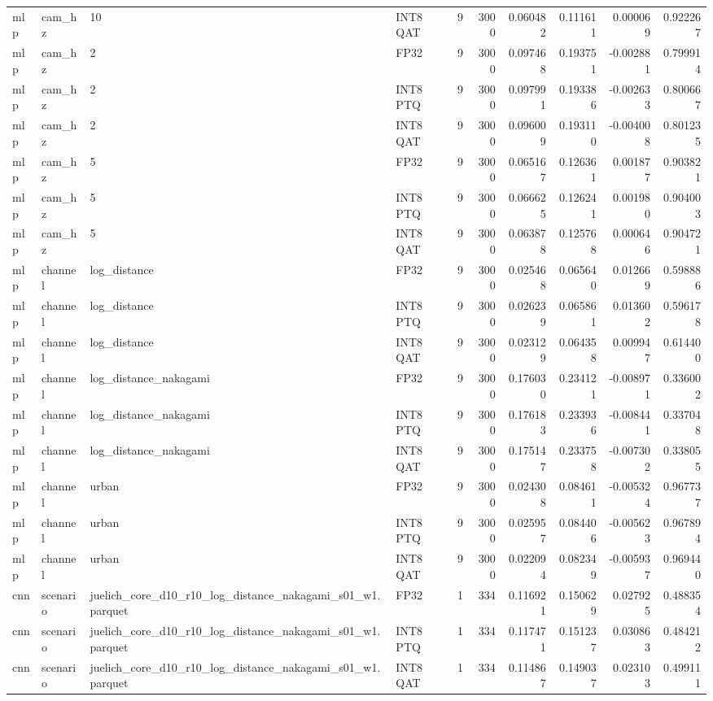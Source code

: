 \begin{tabular}{llllrrrrrr}
mlp & cam\_hz & 10 & INT8 QAT & 9 & 3000 & 0.060482 & 0.111611 & 0.000069 & 0.922267 \\
mlp & cam\_hz & 2 & FP32 & 9 & 3000 & 0.097468 & 0.193751 & -0.002881 & 0.799914 \\
mlp & cam\_hz & 2 & INT8 PTQ & 9 & 3000 & 0.097991 & 0.193386 & -0.002633 & 0.800667 \\
mlp & cam\_hz & 2 & INT8 QAT & 9 & 3000 & 0.096009 & 0.193110 & -0.004008 & 0.801235 \\
mlp & cam\_hz & 5 & FP32 & 9 & 3000 & 0.065167 & 0.126361 & 0.001877 & 0.903821 \\
mlp & cam\_hz & 5 & INT8 PTQ & 9 & 3000 & 0.066625 & 0.126241 & 0.001980 & 0.904003 \\
mlp & cam\_hz & 5 & INT8 QAT & 9 & 3000 & 0.063878 & 0.125768 & 0.000646 & 0.904721 \\
mlp & channel & log\_distance & FP32 & 9 & 3000 & 0.025468 & 0.065640 & 0.012669 & 0.598886 \\
mlp & channel & log\_distance & INT8 PTQ & 9 & 3000 & 0.026239 & 0.065861 & 0.013602 & 0.596178 \\
mlp & channel & log\_distance & INT8 QAT & 9 & 3000 & 0.023129 & 0.064358 & 0.009947 & 0.614400 \\
mlp & channel & log\_distance\_nakagami & FP32 & 9 & 3000 & 0.176030 & 0.234121 & -0.008971 & 0.336002 \\
mlp & channel & log\_distance\_nakagami & INT8 PTQ & 9 & 3000 & 0.176183 & 0.233936 & -0.008441 & 0.337048 \\
mlp & channel & log\_distance\_nakagami & INT8 QAT & 9 & 3000 & 0.175147 & 0.233758 & -0.007302 & 0.338055 \\
mlp & channel & urban & FP32 & 9 & 3000 & 0.024308 & 0.084611 & -0.005324 & 0.967737 \\
mlp & channel & urban & INT8 PTQ & 9 & 3000 & 0.025957 & 0.084406 & -0.005623 & 0.967894 \\
mlp & channel & urban & INT8 QAT & 9 & 3000 & 0.022094 & 0.082349 & -0.005937 & 0.969440 \\
cnn & scenario & juelich\_core\_d10\_r10\_log\_distance\_nakagami\_s01\_w1.parquet & FP32 & 1 & 334 & 0.116921 & 0.150629 & 0.027925 & 0.488354 \\
cnn & scenario & juelich\_core\_d10\_r10\_log\_distance\_nakagami\_s01\_w1.parquet & INT8 PTQ & 1 & 334 & 0.117471 & 0.151237 & 0.030863 & 0.484212 \\
cnn & scenario & juelich\_core\_d10\_r10\_log\_distance\_nakagami\_s01\_w1.parquet & INT8 QAT & 1 & 334 & 0.114867 & 0.149037 & 0.023103 & 0.499111 \\

\end{tabular}
